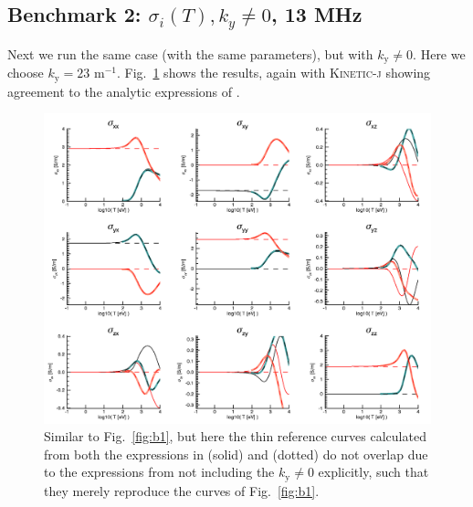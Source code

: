 \documentclass[final,5p,times,twocolumn]{elsarticle}
\newcommand{\kj}{\textsc{Kinetic-j}\xspace}
\begin{document}
\subsection{Benchmark 2: $\sigma_i\left(T\right), k_{y}\ne 0$, 13 MHz}
\label{section:verification2}
%
Next we run the same case (with the same parameters), but with $k_{\mathrm{y}}\ne 0$. Here we choose $k_{\mathrm{y}}=23$ m$^{\mathrm{-1}}$. Fig.~\ref{fig:b2} shows the results, again with \kj showing agreement to the analytic expressions of \cite{swanson}.
%
\begin{figure}
\centering
\includegraphics[]{figures/benchmark2}
\caption{Similar to Fig.~\ref{fig:b1}, but here the thin reference curves calculated from both the expressions in \cite{brambilla} (solid) and \cite{swanson} (dotted) do not overlap due to the expressions from \cite{brambilla} not including the $k_{\mathrm{y}}\ne 0$ explicitly, such that they merely reproduce the curves of Fig.~\ref{fig:b1}.}
\label{fig:b2}
\end{figure}
%
\end{document}
